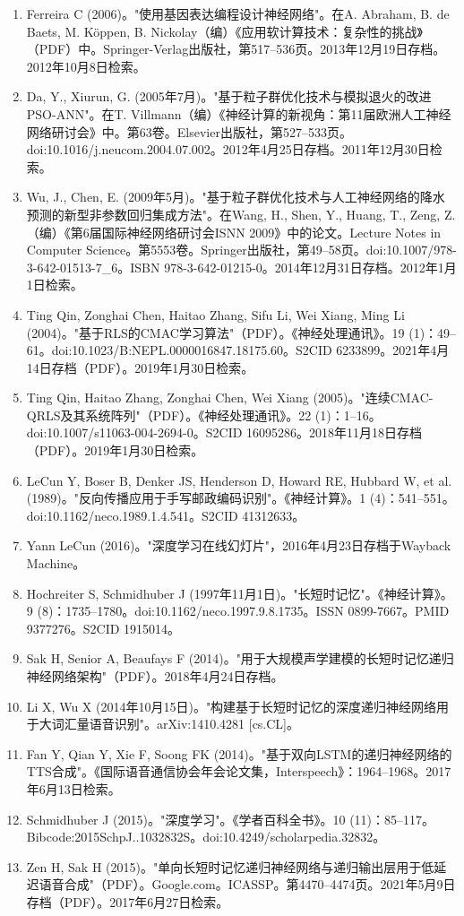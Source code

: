 \begin{enumerate}
\item Ferreira C (2006)。"使用基因表达编程设计神经网络"。在A. Abraham, B. de Baets, M. Köppen, B. Nickolay（编）《应用软计算技术：复杂性的挑战》（PDF）中。Springer-Verlag出版社，第517–536页。2013年12月19日存档。2012年10月8日检索。
\item Da, Y., Xiurun, G. (2005年7月)。"基于粒子群优化技术与模拟退火的改进PSO-ANN"。在T. Villmann（编）《神经计算的新视角：第11届欧洲人工神经网络研讨会》中。第63卷。Elsevier出版社，第527–533页。doi:10.1016/j.neucom.2004.07.002。2012年4月25日存档。2011年12月30日检索。
\item Wu, J., Chen, E. (2009年5月)。"基于粒子群优化技术与人工神经网络的降水预测的新型非参数回归集成方法"。在Wang, H., Shen, Y., Huang, T., Zeng, Z.（编）《第6届国际神经网络研讨会ISNN 2009》中的论文。Lecture Notes in Computer Science。第5553卷。Springer出版社，第49–58页。doi:10.1007/978-3-642-01513-7_6。ISBN 978-3-642-01215-0。2014年12月31日存档。2012年1月1日检索。
\item Ting Qin, Zonghai Chen, Haitao Zhang, Sifu Li, Wei Xiang, Ming Li (2004)。"基于RLS的CMAC学习算法"（PDF）。《神经处理通讯》。19 (1)：49–61。doi:10.1023/B:NEPL.0000016847.18175.60。S2CID 6233899。2021年4月14日存档（PDF）。2019年1月30日检索。
\item Ting Qin, Haitao Zhang, Zonghai Chen, Wei Xiang (2005)。"连续CMAC-QRLS及其系统阵列"（PDF）。《神经处理通讯》。22 (1)：1–16。doi:10.1007/s11063-004-2694-0。S2CID 16095286。2018年11月18日存档（PDF）。2019年1月30日检索。
\item LeCun Y, Boser B, Denker JS, Henderson D, Howard RE, Hubbard W, et al. (1989)。"反向传播应用于手写邮政编码识别"。《神经计算》。1 (4)：541–551。doi:10.1162/neco.1989.1.4.541。S2CID 41312633。
\item Yann LeCun (2016)。"深度学习在线幻灯片"，2016年4月23日存档于Wayback Machine。
\item Hochreiter S, Schmidhuber J (1997年11月1日)。"长短时记忆"。《神经计算》。9 (8)：1735–1780。doi:10.1162/neco.1997.9.8.1735。ISSN 0899-7667。PMID 9377276。S2CID 1915014。
\item Sak H, Senior A, Beaufays F (2014)。"用于大规模声学建模的长短时记忆递归神经网络架构"（PDF）。2018年4月24日存档。
\item Li X, Wu X (2014年10月15日)。"构建基于长短时记忆的深度递归神经网络用于大词汇量语音识别"。arXiv:1410.4281 [cs.CL]。
\item Fan Y, Qian Y, Xie F, Soong FK (2014)。"基于双向LSTM的递归神经网络的TTS合成"。《国际语音通信协会年会论文集，Interspeech》：1964–1968。2017年6月13日检索。
\item Schmidhuber J (2015)。"深度学习"。《学者百科全书》。10 (11)：85–117。Bibcode:2015SchpJ..1032832S。doi:10.4249/scholarpedia.32832。
\item Zen H, Sak H (2015)。"单向长短时记忆递归神经网络与递归输出层用于低延迟语音合成"（PDF）。Google.com。ICASSP。第4470–4474页。2021年5月9日存档（PDF）。2017年6月27日检索。
\end{enumerate}